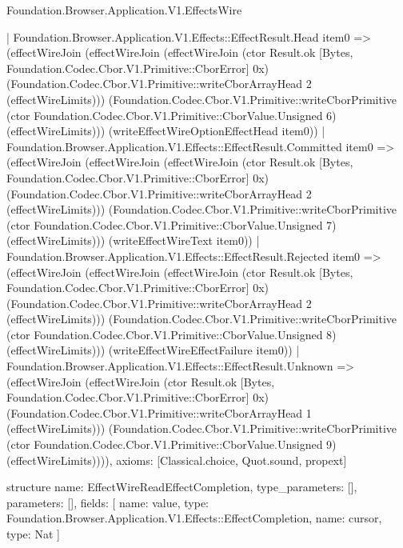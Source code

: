 \begin{lexlean}{Foundation.Browser.Application.V1.EffectsWire}
\begin{semanticmodule}
{    | Foundation.Browser.Application.V1.Effects::EffectResult.Head item0 => (effectWireJoin (effectWireJoin (effectWireJoin (ctor Result.ok [Bytes, Foundation.Codec.Cbor.V1.Primitive::CborError] 0x) (Foundation.Codec.Cbor.V1.Primitive::writeCborArrayHead 2 (effectWireLimits))) (Foundation.Codec.Cbor.V1.Primitive::writeCborPrimitive (ctor Foundation.Codec.Cbor.V1.Primitive::CborValue.Unsigned 6) (effectWireLimits))) (writeEffectWireOptionEffectHead item0))
    | Foundation.Browser.Application.V1.Effects::EffectResult.Committed item0 => (effectWireJoin (effectWireJoin (effectWireJoin (ctor Result.ok [Bytes, Foundation.Codec.Cbor.V1.Primitive::CborError] 0x) (Foundation.Codec.Cbor.V1.Primitive::writeCborArrayHead 2 (effectWireLimits))) (Foundation.Codec.Cbor.V1.Primitive::writeCborPrimitive (ctor Foundation.Codec.Cbor.V1.Primitive::CborValue.Unsigned 7) (effectWireLimits))) (writeEffectWireText item0))
    | Foundation.Browser.Application.V1.Effects::EffectResult.Rejected item0 => (effectWireJoin (effectWireJoin (effectWireJoin (ctor Result.ok [Bytes, Foundation.Codec.Cbor.V1.Primitive::CborError] 0x) (Foundation.Codec.Cbor.V1.Primitive::writeCborArrayHead 2 (effectWireLimits))) (Foundation.Codec.Cbor.V1.Primitive::writeCborPrimitive (ctor Foundation.Codec.Cbor.V1.Primitive::CborValue.Unsigned 8) (effectWireLimits))) (writeEffectWireEffectFailure item0))
    | Foundation.Browser.Application.V1.Effects::EffectResult.Unknown => (effectWireJoin (effectWireJoin (ctor Result.ok [Bytes, Foundation.Codec.Cbor.V1.Primitive::CborError] 0x) (Foundation.Codec.Cbor.V1.Primitive::writeCborArrayHead 1 (effectWireLimits))) (Foundation.Codec.Cbor.V1.Primitive::writeCborPrimitive (ctor Foundation.Codec.Cbor.V1.Primitive::CborValue.Unsigned 9) (effectWireLimits)))),
  axioms: [Classical.choice, Quot.sound, propext]
}

structure{
  name: EffectWireReadEffectCompletion,
  type_parameters: [],
  parameters: [],
  fields: [
    {name: value, type: Foundation.Browser.Application.V1.Effects::EffectCompletion},
    {name: cursor, type: Nat}
  ]
}


\end{semanticmodule}
\end{lexlean}
